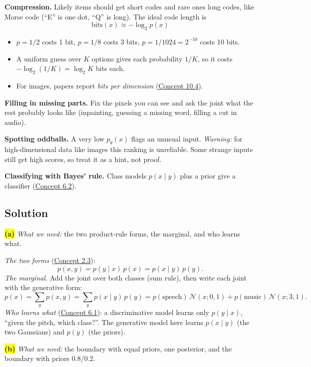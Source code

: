 \documentclass[12pt,a4paper]{article}
\begin{document}
\textbf{Compression.} Likely items should get short codes and rare ones long codes, like Morse code (``E'' is one dot, ``Q'' is long). The ideal code length is
\[
\text{bits}(x)\approx-\log_2 p(x)
\]
\begin{itemize}[nosep]
  \item $p=1/2$ costs 1 bit, $p=1/8$ costs 3 bits, $p=1/1024=2^{-10}$ costs 10 bits.
  \item A uniform guess over $K$ options gives each probability $1/K$, so it costs $-\log_2(1/K)=\log_2K$ bits each.
  \item For images, papers report \emph{bits per dimension} (\hyperref[c10-4]{Concept 10.4}).
\end{itemize}

\textbf{Filling in missing parts.} Fix the pixels you can see and ask the joint what the rest probably looks like (inpainting, guessing a missing word, filling a cut in audio).

\textbf{Spotting oddballs.} A very low $p_\theta(x)$ flags an unusual input. \emph{Warning:} for high-dimensional data like images this ranking is unreliable. Some strange inputs still get high scores, so treat it as a hint, not proof.

\textbf{Classifying with Bayes' rule.} Class models $p(x\mid y)$ plus a prior give a classifier (\hyperref[c6-2]{Concept 6.2}).

\subsection{Solution}

\colorbox{yellow}{\textbf{(a)}} \emph{What we need:} the two product-rule forms, the marginal, and who learns what.

\emph{The two forms} (\hyperref[c2-3]{Concept 2.3}):
\[
p(x,y)=p(y\mid x)\,p(x)=p(x\mid y)\,p(y).
\]
\emph{The marginal.} Add the joint over both classes (sum rule), then write each joint with the generative form:
\[
p(x)=\sum_y p(x,y)=\sum_y p(x\mid y)\,p(y)=p(\text{speech})\,\mathcal{N}(x;0,1)+p(\text{music})\,\mathcal{N}(x;3,1).
\]
\emph{Who learns what} (\hyperref[c6-1]{Concept 6.1}): a discriminative model learns only $p(y\mid x)$, ``given the pitch, which class?''. The generative model here learns $p(x\mid y)$ (the two Gaussians) and $p(y)$ (the priors).

\colorbox{yellow}{\textbf{(b)}} \emph{What we need:} the boundary with equal priors, one posterior, and the boundary with priors 0.8/0.2.
\end{document}
